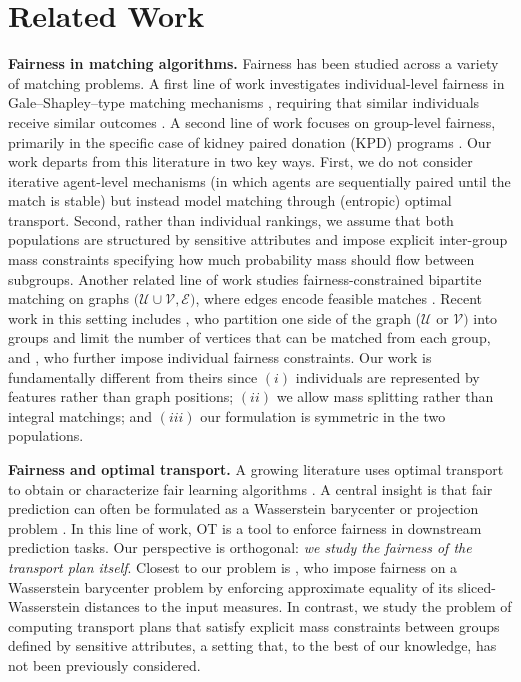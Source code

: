 \documentclass{article}
\theoremstyle{definition}
\begin{document}
\section{Related Work}
\textbf{Fairness in matching algorithms.}
Fairness has been studied across a variety of matching problems. A first line of work investigates individual-level fairness in Gale–Shapley–type matching mechanisms \citep{gale1962college}, requiring that similar individuals receive similar outcomes \citep{karni2021fairness, devic2023fairness}. A second line of work focuses on group-level fairness, primarily in the specific case of kidney paired donation (KPD) programs \citep{ashlagi2014free,dickerson2014price,zhang2025fairness,lobo2025fair}. Our work departs from this literature in two key ways.
First, we do not consider iterative agent-level mechanisms (in which agents are sequentially paired until the match is stable) but instead model matching through (entropic) optimal transport.
Second, rather than individual rankings, we assume that both populations are structured by sensitive attributes and impose explicit inter-group mass constraints specifying how much probability mass should flow between subgroups.
Another related line of work studies fairness-constrained bipartite matching on graphs $\big(\mathcal{U} \cup \mathcal{V}, \mathcal{E}\big)$, where edges encode feasible matches \citep{godsil1981matchings,zdeborova2006number,noiry2021online}. Recent work in this setting includes \citep{castera2026price}, who partition one side of the graph ($\mathcal{U}$ or $\mathcal{V})$ into groups and limit the number of vertices that can be matched from each group, and \citep{panda2024individual}, who further impose individual fairness constraints.
Our work is fundamentally different from theirs since $(i)$ individuals are represented by features rather than graph positions; $(ii)$ we allow mass splitting rather than integral matchings; and $(iii)$ our formulation is symmetric in the two populations.

\textbf{Fairness and optimal transport.}
A growing literature uses optimal transport to obtain or characterize fair learning algorithms \citep{gordaliza2019obtaining,gouic2020projection,chzhen2020fair,DBLP:conf/aaai/ChiappaJSPJA20,DBLP:conf/nips/BuylB22,hu2023fairness,DBLP:conf/icml/XianY023,xiong2024fair,divol2024demographic}.
A central insight is that fair prediction can often be formulated as a Wasserstein barycenter or projection problem \citep{gouic2020projection,chzhen2020fair,divol2024demographic}. In this line of work, OT is a tool to enforce fairness in downstream prediction tasks. Our perspective is orthogonal:\textit{ we study the fairness of the transport plan itself}.
Closest to our problem is \citet{nguyen2024towards}, who impose fairness on a Wasserstein barycenter problem by enforcing approximate equality of its sliced-Wasserstein distances to the input measures. In contrast, we study the problem of computing transport plans that satisfy explicit mass
constraints between groups defined by sensitive attributes, a setting that, to the best of our knowledge, has not been previously considered.
\end{document}
